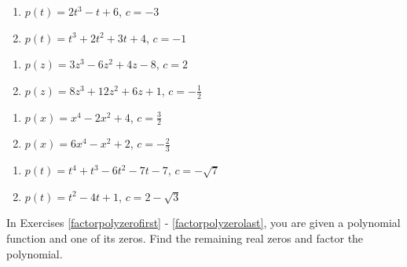 \documentclass{ximera}
\begin{document}
\begin{multicols}{2}
\begin{enumerate}
\setcounter{enumi}{\value{HW}}

\item $p(t) = 2t^3 - t + 6$, $c=-3$
\item $p(t) = t^3+2t^2+3t+4$, $c =-1$

\setcounter{HW}{\value{enumi}}
\end{enumerate}
\end{multicols}

\begin{multicols}{2}
\begin{enumerate}
\setcounter{enumi}{\value{HW}}

\item $p(z) =3z^3-6z^2+4z-8$, $c=2$
\item $p(z) = 8z^3+12z^2+6z+1$, $c =-\frac{1}{2}$

\setcounter{HW}{\value{enumi}}
\end{enumerate}
\end{multicols}

\begin{multicols}{2}
\begin{enumerate}
\setcounter{enumi}{\value{HW}}

\item $p(x) = x^4 - 2x^2+4$, $c=\frac{3}{2}$
\item $p(x) = 6x^4-x^2+2$, $c =-\frac{2}{3}$

\setcounter{HW}{\value{enumi}}
\end{enumerate}
\end{multicols}


\begin{multicols}{2}
\begin{enumerate}
\setcounter{enumi}{\value{HW}}

\item $p(t) = t^4 +t^3-6t^2-7t-7$, $c=-\sqrt{7}$
\item $p(t) = t^2-4t+1$, $c =2-\sqrt{3}$ \label{remainderexerlast}

\setcounter{HW}{\value{enumi}}
\end{enumerate}
\end{multicols}



In Exercises \ref{factorpolyzerofirst} - \ref{factorpolyzerolast}, you are given a polynomial function and one of its zeros.  Find the remaining real zeros and factor the polynomial.  
\end{document}
